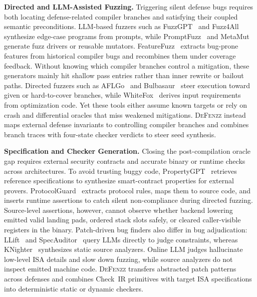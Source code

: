 \documentclass[conference,compsoc]{IEEEtran}
\begin{document}
\medskip\noindent\textbf{Directed and LLM-Assisted Fuzzing.}
Triggering silent defense bugs requires both locating defense-related compiler branches and satisfying their coupled semantic preconditions.
LLM-based fuzzers such as FuzzGPT~\cite{deng2024fuzzgpt} and Fuzz4All~\cite{xia2024fuzz4all} synthesize edge-case programs from prompts, while PromptFuzz~\cite{lyu2024promptfuzz} and MetaMut~\cite{ou2024metamut} generate fuzz drivers or reusable mutators.
FeatureFuzz~\cite{he2026featurefuzz} extracts bug-prone features from historical compiler bugs and recombines them under coverage feedback.
Without knowing which compiler branches control a mitigation, these generators mainly hit shallow pass entries rather than inner rewrite or bailout paths.
Directed fuzzers such as AFLGo~\cite{bohme2017aflgo} and Bulbasaur~\cite{wang2026bulbasaur} steer execution toward given or hard-to-cover branches, while WhiteFox~\cite{yang2024whitefox} derives input requirements from optimization code.
Yet these tools either assume known targets or rely on crash and differential oracles that miss weakened mitigations.
\textsc{DeFenzz} instead maps external defense invariants to controlling compiler branches and combines branch traces with four-state checker verdicts to steer seed synthesis.

\medskip\noindent\textbf{Specification and Checker Generation.}
Closing the post-compilation oracle gap requires external security contracts and accurate binary or runtime checks across architectures.
To avoid trusting buggy code, PropertyGPT~\cite{liu2025propertygpt} retrieves reference specifications to synthesize smart-contract properties for external provers.
ProtocolGuard~\cite{song2026protocolguard} extracts protocol rules, maps them to source code, and inserts runtime assertions to catch silent non-compliance during directed fuzzing.
Source-level assertions, however, cannot observe whether backend lowering emitted valid landing pads, ordered stack slots safely, or cleared caller-visible registers in the binary.
Patch-driven bug finders also differ in bug adjudication: LLift~\cite{li2024llift} and SpecAuditor~\cite{lin2026specauditor} query LLMs directly to judge constraints, whereas KNighter~\cite{yang2025knighter} synthesizes static source analyzers.
Online LLM judges hallucinate low-level ISA details and slow down fuzzing, while source analyzers do not inspect emitted machine code.
\textsc{DeFenzz} transfers abstracted patch patterns across defenses and combines Check~IR primitives with target ISA specifications into deterministic static or dynamic checkers.
\end{document}
